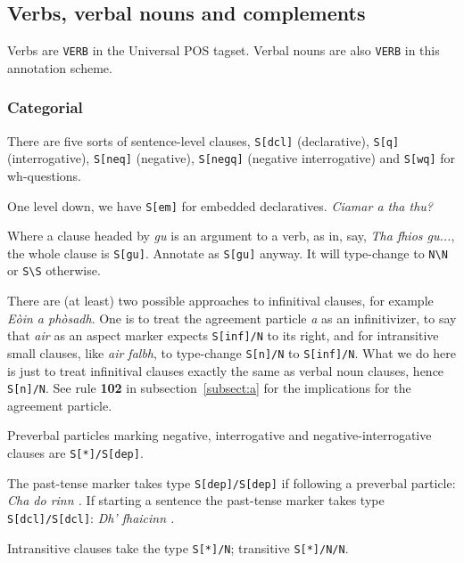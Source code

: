 \documentclass[a4paper]{article}
\begin{document}
\subsection{Verbs, verbal nouns and complements\label{subsect:verbs}}

Verbs are \texttt{VERB} in the Universal POS tagset.
Verbal nouns are also \texttt{VERB} in this annotation scheme.




\subsubsection*{Categorial}
 There are five sorts of sentence-level clauses, \texttt{S[dcl]} (declarative), \texttt{S[q]} (interrogative), \texttt{S[neq]} (negative), \texttt{S[negq]} (negative interrogative) and \texttt{S[wq]} for wh-questions.

 One level down, we have \texttt{S[em]} for embedded declaratives.
\textit{Ciamar a tha thu?}

 Where a clause headed by \textit{gu} is an argument to a verb, as in, say, \textit{Tha fhios gu...}, the whole clause is \texttt{S[gu]}.
Annotate as \texttt{S[gu]} anyway.
It will type-change to \texttt{N\textbackslash N} or \texttt{S\textbackslash S} otherwise.

 There are (at least) two possible approaches to infinitival clauses, for example \textit{E\`oin a ph\`osadh}.
One is to treat the agreement particle \textit{a} as an infinitivizer, to say that \textit{air} as an aspect marker expects \texttt{S[inf]/N} to its right, and for intransitive small clauses, like \textit{air falbh}, to type-change \texttt{S[n]/N} to \texttt{S[inf]/N}.
What we do here is just to treat infinitival clauses exactly the same as verbal noun clauses, hence \texttt{S[n]/N}.
See rule {\bf 102} in subsection~\ref{subsect:a} for the implications for the agreement particle.

 Preverbal particles marking negative, interrogative and negative-interrogative clauses are \texttt{S[*]/S[dep]}.

 The past-tense marker takes type \texttt{S[dep]/S[dep]} if following a preverbal particle: \textit{Cha do rinn .}
If starting a sentence the past-tense marker takes type \texttt{S[dcl]/S[dcl]}: \textit{Dh' fhaicinn .}

 Intransitive clauses take the type \texttt{S[*]/N}; transitive \texttt{S[*]/N/N}.
\end{document}
